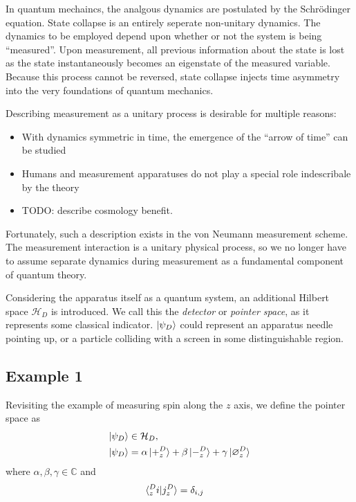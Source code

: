 In quantum mechaincs, the analgous dynamics are postulated by the Schrödinger equation. State collapse is an entirely seperate non-unitary dynamics. The dynamics to be employed depend upon whether or not the system is being ``measured''. Upon measurement, all previous information about the state is lost as the state instantaneously becomes an eigenstate of the measured variable. Because this process cannot be reversed, state collapse injects time asymmetry into the very foundations of quantum mechanics.

Describing measurement as a unitary process is desirable for multiple reasons:
\begin{itemize}
  \item With dynamics symmetric in time, the emergence of the ``arrow of time'' can be studied
  \item Humans and measurement apparatuses do not play a special role indescribale by the theory
  \item TODO: describe cosmology benefit.
\end{itemize}

Fortunately, such a description exists in the von Neumann measurement scheme. The measurement interaction is a unitary physical process, so we no longer have to assume separate dynamics during measurement as a fundamental component of quantum theory.

Considering the apparatus itself as a quantum system, an additional Hilbert space $\mathcal{H}_D$ is introduced. We call this the \textit{detector} or \textit{pointer space}, as it represents some classical indicator. $\ket{\psi_D}$ could represent an apparatus needle pointing up, or a particle colliding with a screen in some distinguishable region.

\subsection{Example 1}
Revisiting the example of measuring spin along the $z$ axis, we define the pointer space as
\begin{align}
  \ket{\psi_D} &\in \mathcal{H}_D, \\
  \nonumber \ket{\psi_D} &= \alpha \ket{+^D_z} + \beta \ket{-^D_z} + \gamma \ket{\varnothing^D_z}
\end{align}
where $\alpha, \beta, \gamma \in \mathbb{C}$ and
\begin{align}
    \braket{^D_zi|j^D_z} &=\delta_{i,j}
\end{align}

